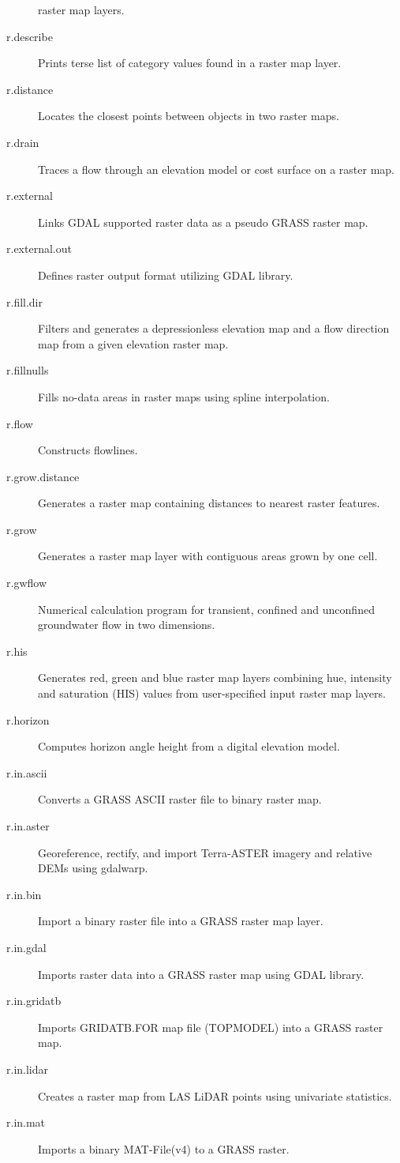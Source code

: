 \begin{description}
raster map layers.
\item [{r.describe}] Prints terse list of category values found in a raster
map layer.
\item [{r.distance}] Locates the closest points between objects in two
raster maps.
\item [{r.drain}] Traces a flow through an elevation model or cost surface
on a raster map.
\item [{r.external}] Links GDAL supported raster data as a pseudo GRASS
raster map.
\item [{r.external.out}] Defines raster output format utilizing GDAL library.
\item [{r.fill.dir}] Filters and generates a depressionless elevation map
and a flow direction map from a given elevation raster map.
\item [{r.fillnulls}] Fills no-data areas in raster maps using spline interpolation.
\item [{r.flow}] Constructs flowlines.
\item [{r.grow.distance}] Generates a raster map containing distances to
nearest raster features.
\item [{r.grow}] Generates a raster map layer with contiguous areas grown
by one cell.
\item [{r.gwflow}] Numerical calculation program for transient, confined
and unconfined groundwater flow in two dimensions.
\item [{r.his}] Generates red, green and blue raster map layers combining
hue, intensity and saturation (HIS) values from user-specified input
raster map layers.
\item [{r.horizon}] Computes horizon angle height from a digital elevation
model.
\item [{r.in.ascii}] Converts a GRASS ASCII raster file to binary raster
map.
\item [{r.in.aster}] Georeference, rectify, and import Terra-ASTER imagery
and relative DEMs using gdalwarp.
\item [{r.in.bin}] Import a binary raster file into a GRASS raster map
layer.
\item [{r.in.gdal}] Imports raster data into a GRASS raster map using GDAL
library.
\item [{r.in.gridatb}] Imports GRIDATB.FOR map file (TOPMODEL) into a GRASS
raster map.
\item [{r.in.lidar}] Creates a raster map from LAS LiDAR points using univariate
statistics.
\item [{r.in.mat}] Imports a binary MAT-File(v4) to a GRASS raster.

\end{description}
